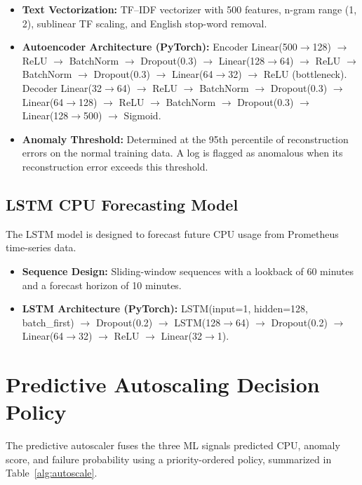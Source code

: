 \documentclass[a4paper,14pt,onecolumn]{report}
\begin{document}
\begin{itemize}
    \item \textbf{Text Vectorization:} TF--IDF vectorizer with 500 features, n-gram range (1, 2), sublinear TF scaling, and English stop-word removal.
    \item \textbf{Autoencoder Architecture (PyTorch):} Encoder Linear(500$\rightarrow$128) $\rightarrow$ ReLU $\rightarrow$ BatchNorm $\rightarrow$ Dropout(0.3) $\rightarrow$ Linear(128$\rightarrow$64) $\rightarrow$ ReLU $\rightarrow$ BatchNorm $\rightarrow$ Dropout(0.3) $\rightarrow$ Linear(64$\rightarrow$32) $\rightarrow$ ReLU (bottleneck). Decoder Linear(32$\rightarrow$64) $\rightarrow$ ReLU $\rightarrow$ BatchNorm $\rightarrow$ Dropout(0.3) $\rightarrow$ Linear(64$\rightarrow$128) $\rightarrow$ ReLU $\rightarrow$ BatchNorm $\rightarrow$ Dropout(0.3) $\rightarrow$ Linear(128$\rightarrow$500) $\rightarrow$ Sigmoid.
    \item \textbf{Anomaly Threshold:} Determined at the 95th percentile of reconstruction errors on the normal training data. A log is flagged as anomalous when its reconstruction error exceeds this threshold.
\end{itemize}

\subsection{LSTM CPU Forecasting Model}

The LSTM model is designed to forecast future CPU usage from Prometheus time-series data.

\begin{itemize}
    \item \textbf{Sequence Design:} Sliding-window sequences with a lookback of 60 minutes and a forecast horizon of 10 minutes.
    \item \textbf{LSTM Architecture (PyTorch):} LSTM(input=1, hidden=128, batch\_first) $\rightarrow$ Dropout(0.2) $\rightarrow$ LSTM(128$\rightarrow$64) $\rightarrow$ Dropout(0.2) $\rightarrow$ Linear(64$\rightarrow$32) $\rightarrow$ ReLU $\rightarrow$ Linear(32$\rightarrow$1).
\end{itemize}

\section{Predictive Autoscaling Decision Policy}

The predictive autoscaler fuses the three ML signals predicted CPU, anomaly score, and failure probability using a priority-ordered policy, summarized in Table~\ref{alg:autoscale}.
\end{document}
